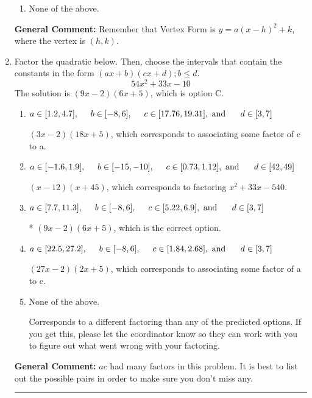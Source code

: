 \documentclass{extbook}[14pt]
\newcommand{\litem}[1]{\item #1

\rule{\textwidth}{0.4pt}}
\begin{document}
\begin{enumerate}
{\begin{enumerate}[label=\Alph*.]
\begin{multicols}{2}
\end{multicols}\item None of the above.\end{enumerate}
\textbf{General Comment:} Remember that Vertex Form is $y = a(x-h)^2+k$, where the vertex is $(h, k)$.
}
\litem{
Factor the quadratic below. Then, choose the intervals that contain the constants in the form $(ax+b)(cx+d); b \leq d.$
\[ 54x^{2} +33 x -10 \]
The solution is \( (9x -2)(6x + 5) \), which is option C.\begin{enumerate}[label=\Alph*.]
\item \( a \in [1.2, 4.7], \hspace*{5mm} b \in [-8, 6], \hspace*{5mm} c \in [17.76, 19.31], \text{ and } \hspace*{5mm} d \in [3, 7] \)

 $(3x -2)(18x + 5)$, which corresponds to associating some factor of c to a.
\item \( a \in [-1.6, 1.9], \hspace*{5mm} b \in [-15, -10], \hspace*{5mm} c \in [0.73, 1.12], \text{ and } \hspace*{5mm} d \in [42, 49] \)

 $(x -12)(x + 45)$, which corresponds to factoring $x^{2} +33 x -540$.
\item \( a \in [7.7, 11.3], \hspace*{5mm} b \in [-8, 6], \hspace*{5mm} c \in [5.22, 6.9], \text{ and } \hspace*{5mm} d \in [3, 7] \)

* $(9x -2)(6x + 5)$, which is the correct option.
\item \( a \in [22.5, 27.2], \hspace*{5mm} b \in [-8, 6], \hspace*{5mm} c \in [1.84, 2.68], \text{ and } \hspace*{5mm} d \in [3, 7] \)

 $(27x -2)(2x + 5)$, which corresponds to associating some factor of a to c.
\item \( \text{None of the above.} \)

 Corresponds to a different factoring than any of the predicted options. If you get this, please let the coordinator know so they can work with you to figure out what went wrong with your factoring.
\end{enumerate}

\textbf{General Comment:} $ac$ had many factors in this problem. It is best to list out the possible pairs in order to make sure you don't miss any.
}
\end{enumerate}
\end{document}
